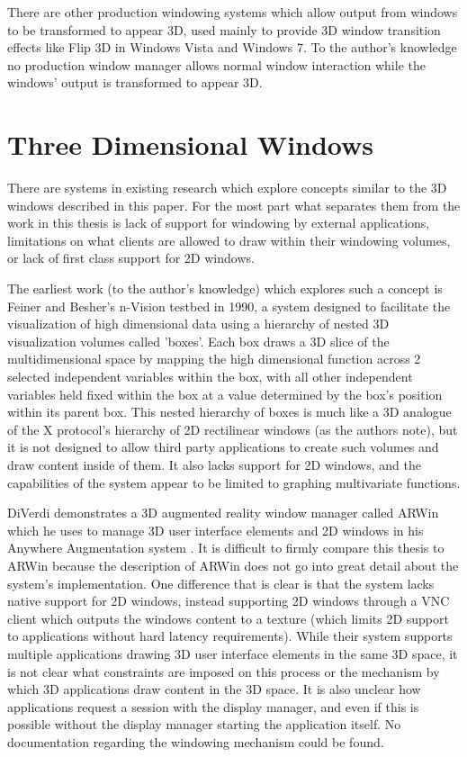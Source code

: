 There are other production windowing systems which allow output from windows to be transformed to appear 3D, used mainly to provide 3D window transition effects like Flip 3D in Windows Vista and Windows 7. To the author's knowledge no production window manager allows normal window interaction while the windows' output is transformed to appear 3D.

\section{Three Dimensional Windows}

There are systems in existing research which explore concepts similar to the 3D windows described in this paper. For the most part what separates them from the work in this thesis is lack of support for windowing by external applications, limitations on what clients are allowed to draw within their windowing volumes, or lack of first class support for 2D windows.

The earliest work (to the author's knowledge) which explores such a concept is Feiner and Besher's n-Vision testbed \cite{nvision} in 1990, a system designed to facilitate the visualization of high dimensional data using a hierarchy of nested 3D visualization volumes called 'boxes'. Each box draws a 3D slice of the multidimensional space by mapping the high dimensional function across 2 selected independent variables within the box, with all other independent variables held fixed within the box at a value determined by the box's position within its parent box. This nested hierarchy of boxes is much like a 3D analogue of the X protocol's hierarchy of 2D rectilinear windows (as the authors note), but it is not designed to allow third party applications to create such volumes and draw content inside of them. It also lacks support for 2D windows, and the capabilities of the system appear to be limited to graphing multivariate functions.

DiVerdi demonstrates a 3D augmented reality window manager called ARWin \cite{arwin} which he uses to manage 3D user interface elements and 2D windows in his Anywhere Augmentation system \cite{anywhere-augmentation}. It is difficult to firmly compare this thesis to ARWin because the description of ARWin does not go into great detail about the system's implementation. One difference that is clear is that the system lacks native support for 2D windows, instead supporting 2D windows through a VNC client which outputs the windows content to a texture (which limits 2D support to applications without hard latency requirements). While their system supports multiple applications drawing 3D user interface elements in the same 3D space, it is not clear what constraints are imposed on this process or the mechanism by which 3D applications draw content in the 3D space. It is also unclear how applications request a session with the display manager, and even if this is possible without the display manager starting the application itself. No documentation regarding the windowing mechanism could be found.

